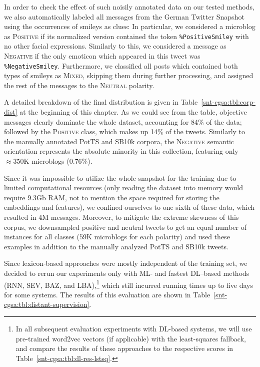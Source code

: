 In order to check the effect of such noisily annotated data on our
tested methods, we also automatically labeled all messages from the
German Twitter Snapshot~\cite{Scheffler:14} using the occurrences of
smileys as clues: In particular, we considered a microblog as
\textsc{Positive} if its normalized version contained the token
\texttt{\%PositiveSmiley} with no other facial expressions.  Similarly
to this, we considered a message as \textsc{Negative} if the only
emoticon which appeared in this tweet was \texttt{\%NegativeSmiley}.
Furthermore, we classified all posts which contained both types of
smileys as \textsc{Mixed}, skipping them during further processing,
and assigned the rest of the messages to the \textsc{Neutral}
polarity.

A detailed breakdown of the final distribution is given in
Table~\ref{snt-cgsa:tbl:corp-dist} at the beginning of this
chapter. As we could see from the table, objective messages clearly
dominate the whole dataset, accounting for 84\% of the data; followed
by the \textsc{Positive} class, which makes up 14\% of the tweets.
Similarly to the manually annotated PotTS and SB10k corpora, the
\textsc{Negative} semantic orientation represents the absolute
minority in this collection, featuring only $\approx 350$K microblogs
(0.76\%).

Since it was impossible to utilize the whole snapshot for the training
due to limited computational resources (only reading the dataset into
memory would require 9.3Gb RAM, not to mention the space required for
storing the embeddings and features), we confined ourselves to one
sixth of these data, which resulted in 4M messages.  Moreover, to
mitigate the extreme skewness of this corpus, we downsampled positive
and neutral tweets to get an equal number of instances for all classes
(59K microblogs for each polarity) and used these examples in addition
to the manually analyzed PotTS and SB10k tweets.

Since lexicon-based approaches were mostly independent of the training
set, we decided to rerun our experiments only with ML- and fastest
DL--based methods (RNN, SEV, BAZ, and LBA),\footnote{In all subsequent
  evaluation experiments with DL-based systems, we will use
  pre-trained word2vec vectors (if applicable) with the least-squares
  fallback, and compare the results of these approaches to the
  respective scores in Table~\ref{snt-cgsa:tbl:dl-res-lstsq}.} which
still incurred running times up to five days for some systems.  The
results of this evaluation are shown in
Table~\ref{snt-cgsa:tbl:distant-supervision}.

